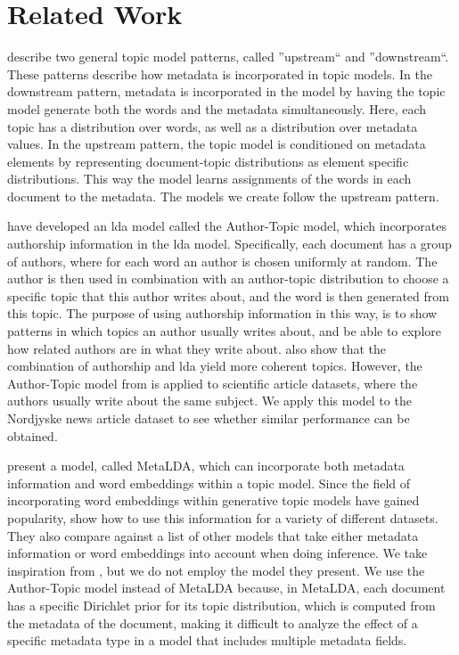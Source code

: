 \section{Related Work}\label{sec:related_work}
\citet{mimno2008topic} describe two general topic model patterns, called ''upstream`` and ''downstream``.
These patterns describe how metadata is incorporated in topic models.
In the downstream pattern, metadata is incorporated in the model by having the topic model generate both the words and the metadata simultaneously.
Here, each topic has a distribution over words, as well as a distribution over metadata values.
In the upstream pattern, the topic model is conditioned on metadata elements by representing document-topic distributions as element specific distributions.
This way the model learns assignments of the words in each document to the metadata.
The models we create follow the upstream pattern.

\citet{author_topic_2012} have developed an \gls{lda} model called the Author-Topic model, which incorporates authorship information in the \gls{lda} model.
Specifically, each document has a group of authors, where for each word an author is chosen uniformly at random.
The author is then used in combination with an author-topic distribution to choose a specific topic that this author writes about, and the word is then generated from this topic.
The purpose of using authorship information in this way, is to show patterns in which topics an author usually writes about, and be able to explore how related authors are in what they write about.
\citeauthor{author_topic_2012} also show that the combination of authorship and \gls{lda} yield more coherent topics.
However, the Author-Topic model from \citet{author_topic_2012} is applied to scientific article datasets, where the authors usually write about the same subject.
We apply this model to the Nordjyske news article dataset to see whether similar performance can be obtained.

\citet{MetaLDA2017} present a model, called MetaLDA, which can incorporate both metadata information and word embeddings within a topic model.
Since the field of incorporating word embeddings within generative topic models have gained popularity\cite{dieng2020topic}, \citet{MetaLDA2017} show how to use this information for a variety of different datasets.
They also compare against a list of other models that take either metadata information or word embeddings into account when doing inference.
We take inspiration from \citet{MetaLDA2017}, but we do not employ the model they present. 
We use the Author-Topic model instead of MetaLDA because, in MetaLDA, each document has a specific Dirichlet prior for its topic distribution, which is computed from the metadata of the document, making it difficult to analyze the effect of a specific metadata type in a model that includes multiple metadata fields.

